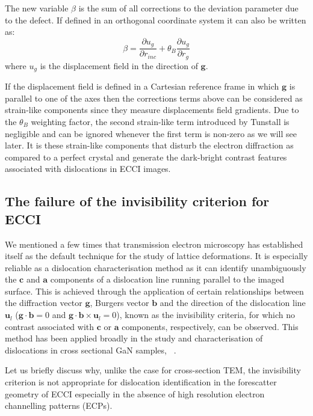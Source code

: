The new variable $\beta$ is the sum of all corrections to the deviation parameter due to the defect. If defined in an orthogonal coordinate system it can also be written as:
\begin{equation}
\label{eq:beta}
    \beta = \frac{\partial u_g}{\partial r_{inc}} + \theta_B\frac{\partial u_g}{\partial r_g}
\end{equation}
where $u_g$ is the displacement field in the direction of $\mathbf{g}$.

 If the displacement field is defined in a Cartesian reference frame in which $\mathbf{g}$ is parallel to one of the axes then the corrections terms above can be considered as strain-like components since they measure displacements field gradients. Due to the $\theta_B$ weighting factor, the second strain-like term introduced by Tunstall is negligible and can be ignored whenever the first term is non-zero as we will see later. It is these strain-like components that disturb the electron diffraction as compared to a perfect crystal and generate the dark-bright contrast features associated with dislocations in ECCI images.
 
\subsection{The failure of the invisibility criterion for ECCI}

We mentioned a few times that transmission electron microscopy has established itself as the default technique for the study of lattice deformations. It is especially reliable as a dislocation characterisation method as it can identify unambiguously the $\mathbf{c}$ and $\mathbf{a}$ components of a dislocation line running parallel to the imaged surface. This is achieved through the application of certain relationships between the diffraction vector $\mathbf{g}$, Burgers vector $\mathbf{b}$ and the direction of the dislocation line $\mathbf{u}_l$ ($\mathbf{g} \cdot \mathbf{b} = 0$ and $\mathbf{g} \cdot \mathbf{b} \times \mathbf{u}_l = 0$), known as the invisibility criteria, for which no contrast associated with $\mathbf{c}$ or $\mathbf{a}$ components, respectively, can be observed. This method has been applied broadly in the study and characterisation of dislocations in cross sectional GaN samples, \eg ~\cite{Hino00}.


Let us briefly discuss why, unlike the case for cross-section TEM, the invisibility criterion is not appropriate for dislocation identification in the forescatter geometry of ECCI especially in the absence of high resolution electron channelling patterns (ECPs).

